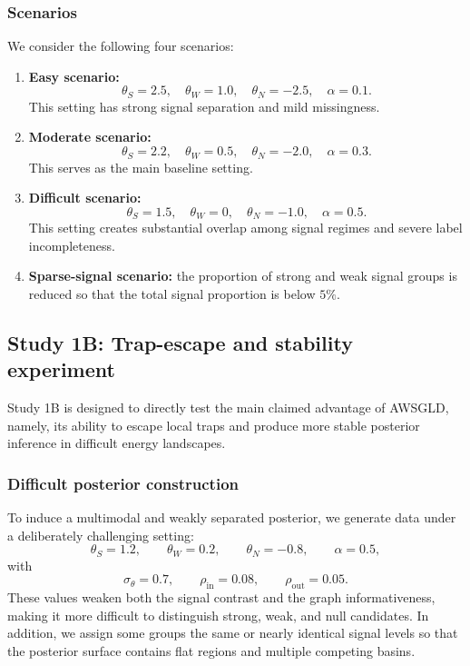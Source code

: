 \documentclass[11pt]{article}
\begin{document}
\subsubsection{Scenarios}

We consider the following four scenarios:
\begin{enumerate}
    \item \textbf{Easy scenario:}
    \[
    \theta_S=2.5,\quad \theta_W=1.0,\quad \theta_N=-2.5,\quad \alpha=0.1.
    \]
    This setting has strong signal separation and mild missingness.

    \item \textbf{Moderate scenario:}
    \[
    \theta_S=2.2,\quad \theta_W=0.5,\quad \theta_N=-2.0,\quad \alpha=0.3.
    \]
    This serves as the main baseline setting.

    \item \textbf{Difficult scenario:}
    \[
    \theta_S=1.5,\quad \theta_W=0,\quad \theta_N=-1.0,\quad \alpha=0.5.
    \]
    This setting creates substantial overlap among signal regimes and severe label incompleteness.

    \item \textbf{Sparse-signal scenario:}
    the proportion of strong and weak signal groups is reduced so that the total signal proportion is below $5\%$.
\end{enumerate}

\subsection{Study 1B: Trap-escape and stability experiment}
\label{subsec:sim_trap}

Study 1B is designed to directly test the main claimed advantage of AWSGLD, namely, its ability to escape local traps and produce more stable posterior inference in difficult energy landscapes.

\subsubsection{Difficult posterior construction}

To induce a multimodal and weakly separated posterior, we generate data under a deliberately challenging setting:
\[
\theta_S=1.2,\qquad \theta_W=0.2,\qquad \theta_N=-0.8,\qquad \alpha=0.5,
\]
with
\[
\sigma_\theta = 0.7,\qquad \rho_{\mathrm{in}}=0.08,\qquad \rho_{\mathrm{out}}=0.05.
\]
These values weaken both the signal contrast and the graph informativeness, making it more difficult to distinguish strong, weak, and null candidates. In addition, we assign some groups the same or nearly identical signal levels so that the posterior surface contains flat regions and multiple competing basins.
\end{document}
